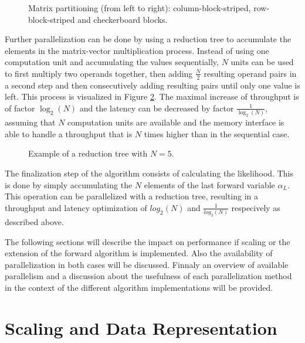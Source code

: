 \documentclass[mscthesis]{usiinfthesis}
\begin{document}
\begin{figure}
    \centering
    
    \caption{Matrix partitioning (from left to right): column-block-striped,
        row-block-striped and checkerboard blocks.}
    \label{fig:matrix_partitioning}
\end{figure}

Further parallelization can be done by using a reduction tree to accumulate the
elements in the matrix-vector multiplication process. Instead of using one
computation unit and accumulating the values sequentially, $N$ units can be used
to first multiply two operands together, then adding $\frac{N}{2}$ resulting
operand pairs in a second step and then consecutively adding resulting pairs
until only one value is left. This process is visualized in Figure
\ref{fig:red_tree}. The maximal increase of throughput is of factor $\log_2(N)$
and the latency can be decreased by factor $\frac{1}{\log_2(N)}$, assuming that
$N$ computation units are available and the memory interface is able to handle
a throughput that is $N$ times higher than in the sequential case.

\begin{figure}
    \centering
    
    \caption{Example of a reduction tree with $N=5$.}
    \label{fig:red_tree}
\end{figure}

The finalization step of the algorithm consists of calculating the likelihood.
This is done by simply accumulating the $N$ elements of the last forward
variable $\alpha_L$. This operation can be parallelized with a reduction tree,
resulting in a throughput and latency optimization of $log_2(N)$ and
$\frac{1}{log_2(N)}$ respecively as described above.

The following sections will describe the impact on performance if scaling or
the extension of the forward algorithm is implemented. Also the availability of
parallelization in both cases will be discussed. Finnaly an overview of
available parallelism and a discussion about the usefulness of each
parallelization method in the context of the different algorithm
implementations will be provided.

\section{Scaling and Data Representation}
\label{ch:analysis_scaling}
\end{document}
